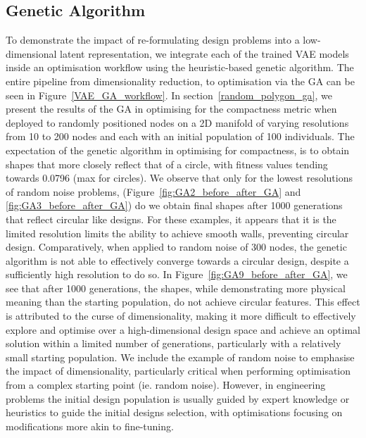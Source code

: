 \documentclass{article}
\begin{document}
\subsection{Genetic Algorithm}
To demonstrate the impact of re-formulating design problems into a low-dimensional latent representation, we integrate each of the trained VAE models inside an optimisation workflow using the heuristic-based genetic algorithm. The entire pipeline from dimensionality reduction, to optimisation via the GA can be seen in Figure~\ref{VAE_GA_workflow}. In section~\ref{random_polygon_ga}, we present the results of the GA in optimising for the compactness metric when deployed to randomly positioned nodes on a 2D manifold of varying resolutions from 10 to 200 nodes and each with an initial population of 100 individuals. The expectation of the genetic algorithm in optimising for compactness, is to obtain shapes that more closely reflect that of a circle, with fitness values tending towards 0.0796 (max for circles). We observe that only for the lowest resolutions of random noise problems, (Figure~\ref{fig:GA2_before_after_GA} and \ref{fig:GA3_before_after_GA}) do we obtain final shapes after 1000 generations that reflect circular like designs. For these examples, it appears that it is the limited resolution limits the ability to achieve smooth walls, preventing circular design. Comparatively, when applied to random noise of 300 nodes, the genetic algorithm is not able to effectively converge towards a circular design, despite a sufficiently high resolution to do so. In Figure~\ref{fig:GA9_before_after_GA}, we see that after 1000 generations, the shapes, while demonstrating more physical meaning than the starting population, do not achieve circular features. This effect is attributed to the curse of dimensionality, making it more difficult to effectively explore and optimise over a high-dimensional design space and achieve an optimal solution within a limited number of generations, particularly with a relatively small starting population. We include the example of random noise to emphasise the impact of dimensionality, particularly critical when performing optimisation from a complex starting point (ie. random noise). However, in engineering problems the initial design population is usually guided by expert knowledge or heuristics to guide the initial designs selection, with optimisations focusing on modifications more akin to fine-tuning.
\end{document}
